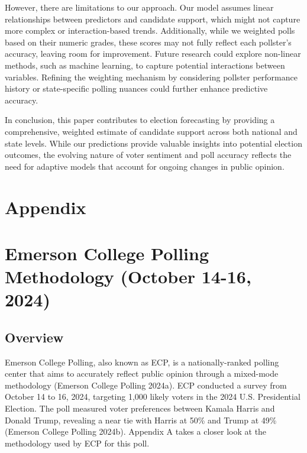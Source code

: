 \documentclass[
  letterpaper,
  DIV=11,
  numbers=noendperiod]{scrartcl}
\begin{document}
However, there are limitations to our approach. Our model assumes linear
relationships between predictors and candidate support, which might not
capture more complex or interaction-based trends. Additionally, while we
weighted polls based on their numeric grades, these scores may not fully
reflect each pollster's accuracy, leaving room for improvement. Future
research could explore non-linear methods, such as machine learning, to
capture potential interactions between variables. Refining the weighting
mechanism by considering pollster performance history or state-specific
polling nuances could further enhance predictive accuracy.

In conclusion, this paper contributes to election forecasting by
providing a comprehensive, weighted estimate of candidate support across
both national and state levels. While our predictions provide valuable
insights into potential election outcomes, the evolving nature of voter
sentiment and poll accuracy reflects the need for adaptive models that
account for ongoing changes in public opinion.

\newpage

\appendix

\hypertarget{appendix}{%
\section*{Appendix}\label{appendix}}

\hypertarget{emerson-college-polling-methodology-october-14-16-2024}{%
\section{Emerson College Polling Methodology (October 14-16,
2024)}\label{emerson-college-polling-methodology-october-14-16-2024}}

\hypertarget{overview}{%
\subsection{Overview}\label{overview}}

Emerson College Polling, also known as ECP, is a nationally-ranked
polling center that aims to accurately reflect public opinion through a
mixed-mode methodology (Emerson College Polling 2024a). ECP conducted a
survey from October 14 to 16, 2024, targeting 1,000 likely voters in the
2024 U.S. Presidential Election. The poll measured voter preferences
between Kamala Harris and Donald Trump, revealing a near tie with Harris
at 50\% and Trump at 49\% (Emerson College Polling 2024b). Appendix A
takes a closer look at the methodology used by ECP for this poll.
\end{document}
